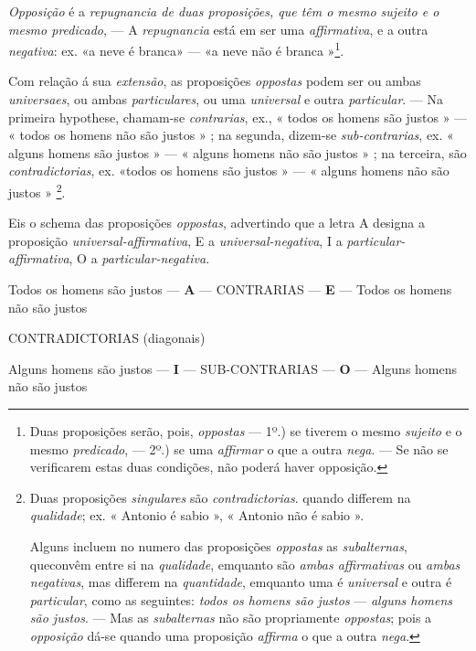 
\emph{Opposição} é a \emph{repugnancia de duas proposições, que têm o mesmo sujeito e o mesmo predicado}, --- A \emph{repugnancia} está em ser uma \emph{affirmativa}, e a outra \emph{negativa}: ex. «a neve é branca» --- «a neve não é branca »\footnote{Duas proposições serão, pois, \emph{oppostas} --- 1º.) se tiverem o mesmo \emph{sujeito} e o mesmo \emph{predicado}, --- 2º.) se uma \emph{affirmar} o que a outra \emph{nega}. --- Se não se verificarem estas duas condições, não poderá haver opposição.}.


Com relação á sua \emph{extensão}, as proposições \emph{oppostas} podem ser ou ambas \emph{universaes}, ou ambas \emph{particulares}, ou uma \emph{universal} e outra \emph{particular}. --- Na primeira hypothese, chamam-se \emph{contrarias}, ex., « todos os homens são justos » --- « todos os homens não são justos » ; na segunda, dizem-se \emph{sub-contrarias}, ex. « alguns homens são justos » --- « alguns homens não são justos » ; na terceira, são \emph{contradictorias}, ex. «todos os homens são justos » --- « alguns homens não são justos » \footnote{Duas proposições \emph{singulares} são \emph{contradictorias}. quando differem na \emph{qualidade}; ex. « Antonio é sabio », « Antonio não é sabio ».\par Alguns incluem no numero das proposições \emph{oppostas} as \emph{subalternas}, queconvêm entre si na \emph{qualidade}, emquanto são \emph{ambas affirmativas} ou \emph{ambas negativas}, mas differem na \emph{quantidade}, emquanto uma é \emph{universal} e outra é \emph{particular}, como as seguintes: \emph{todos os homens são justos} --- \emph{alguns homens são justos}. --- Mas as \emph{subalternas} não são propriamente \emph{oppostas}; pois a \emph{opposição} dá-se quando uma proposição \emph{affirma} o que a outra \emph{nega}.}.

Eis o schema das proposições \emph{oppostas}, advertindo que a letra A designa a proposição \emph{universal-affirmativa}, E a \emph{universal-negativa}, I a \emph{particular-affirmativa}, O a \emph{particular-negativa}.

Todos os homens são justos --- \textbf{A} --- CONTRARIAS --- \textbf{E} --- Todos os homens não são justos

CONTRADICTORIAS (diagonais)

Alguns homens são justos --- \textbf{I} --- SUB-CONTRARIAS --- \textbf{O} --- Alguns homens não são justos

